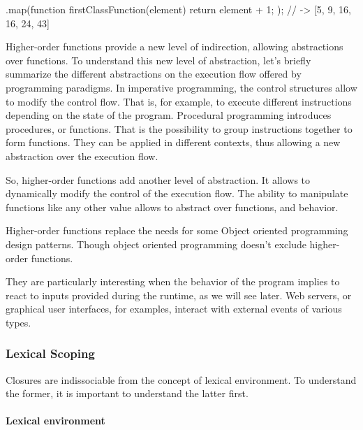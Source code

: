 \begin{code}
  [4, 8, 15, 16, 23, 42].map(function firstClassFunction(element) {
    return element + 1;
  });
  // -> [5, 9, 16, 16, 24, 43]
\end{code}

Higher-order functions provide a new level of indirection, allowing abstractions over functions.
To understand this new level of abstraction, let's briefly summarize the different abstractions on the execution flow offered by programming paradigms.
In imperative programming, the control structures allow to modify the control flow. That is, for example, to execute different instructions depending on the state of the program.
Procedural programming introduces procedures, or functions. That is the possibility to group instructions together to form functions.
They can be applied in different contexts, thus allowing a new abstraction over the execution flow.

So, higher-order functions add another level of abstraction.
It allows to dynamically modify the control of the execution flow.
The ability to manipulate functions like any other value allows to abstract over functions, and behavior.

Higher-order functions replace the needs for some Object oriented programming design patterns. Though object oriented programming doesn't exclude higher-order functions.

They are particularly interesting when the behavior of the program implies to react to inputs provided during the runtime, as we will see later.
Web servers, or graphical user interfaces, for examples, interact with external events of various types.


\subsubsection{Lexical Scoping}

Closures are indissociable from the concept of lexical environment.
To understand the former, it is important to understand the latter first.

\paragraph{Lexical environment}

